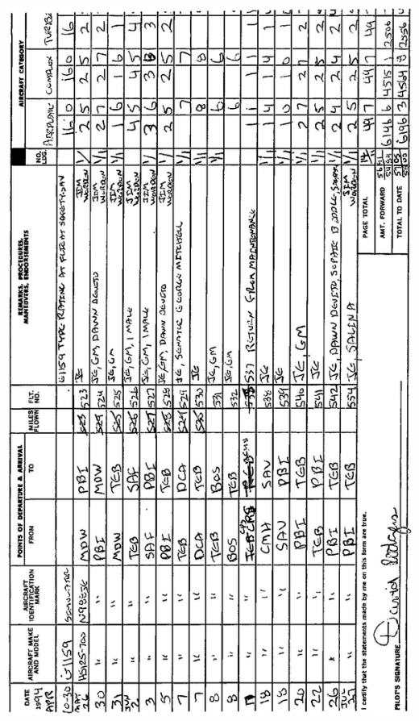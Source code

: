 \documentclass[10pt]{article}
\begin{document}
\includegraphics[max width=\textwidth, center]{2025_02_27_dd68c3d38de88f0516d9g-032}
\end{document}
